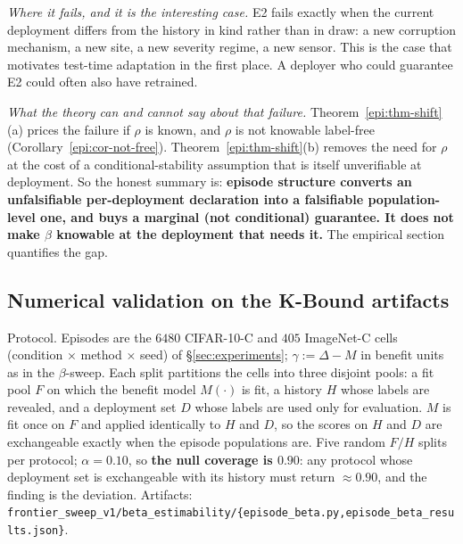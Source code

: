 \emph{Where it fails, and it is the interesting case.} E2 fails exactly when the current deployment
differs from the history in kind rather than in draw: a new corruption mechanism, a new site, a new
severity regime, a new sensor. This is the case that motivates test-time adaptation in the first
place. A deployer who could guarantee E2 could often also have retrained.

\emph{What the theory can and cannot say about that failure.} Theorem~\ref{epi:thm-shift}(a) prices
the failure if $\rho$ is known, and $\rho$ is not knowable label-free
(Corollary~\ref{epi:cor-not-free}). Theorem~\ref{epi:thm-shift}(b) removes the need for $\rho$ at the
cost of a conditional-stability assumption that is itself unverifiable at deployment. So the honest
summary is: \textbf{episode structure converts an unfalsifiable per-deployment declaration into a
falsifiable population-level one, and buys a marginal (not conditional) guarantee. It does not make
$\beta$ knowable at the deployment that needs it.} The empirical section quantifies the gap.

\subsection{Numerical validation on the K-Bound artifacts}
\label{epi:sec-numerics}

Protocol. Episodes are the $6480$ CIFAR-10-C and $405$ ImageNet-C cells (condition $\times$ method
$\times$ seed) of \S\ref{sec:experiments}; $\gamma:=\Delta-M$ in benefit units as in the
$\beta$-sweep. Each split partitions the cells into three disjoint pools: a fit pool $F$ on which the
benefit model $M(\cdot)$ is fit, a history $H$ whose labels are revealed, and a deployment set $D$
whose labels are used only for evaluation. $M$ is fit once on $F$ and applied identically to $H$ and
$D$, so the scores on $H$ and $D$ are exchangeable exactly when the episode populations are. Five
random $F/H$ splits per protocol; $\alpha=0.10$, so \textbf{the null coverage is $0.90$}: any
protocol whose deployment set is exchangeable with its history must return $\approx0.90$, and the
finding is the deviation. Artifacts:
\texttt{frontier\_sweep\_v1/beta\_estimability/\{episode\_beta.py,episode\_beta\_results.json\}}.

